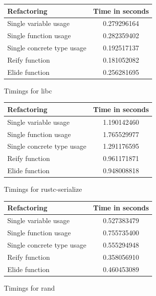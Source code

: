 \begin{figure}[H]
\begin{center}
    \begin{tabular}{ | l | c |}
    \hline
    \textbf{Refactoring} & \textbf{Time in seconds} \\ \hline
    Single variable usage & 0.279296164 \\ \hline
    Single function usage &  0.282359402  \\ \hline
    Single concrete type usage  &  0.192517137 \\ \hline
    Reify function &  0.181052082 \\ \hline
    Elide function &  0.256281695 \\ \hline
    \end{tabular}
\end{center}

\caption{Timings for libc}
\label{Fig:libc}
\end{figure}

\begin{figure}[H]
\begin{center}
    \begin{tabular}{ | l | c |}
    \hline
    \textbf{Refactoring} & \textbf{Time in seconds} \\ \hline
    Single variable usage &  1.190142460 \\ \hline
    Single function usage &  1.765529977  \\ \hline
    Single concrete type usage  &  1.291176595 \\ \hline
    Reify function &  0.961171871  \\ \hline
    Elide function &  0.948008818 \\ \hline
    \end{tabular}
\end{center}

\caption{Timings for rustc-serialize}
\label{Fig:rustc-serialize}
\end{figure}

\begin{figure}[H]
\begin{center}
    \begin{tabular}{ | l | c |}
    \hline
    \textbf{Refactoring} & \textbf{Time in seconds} \\ \hline
    Single variable usage &  0.527383479 \\ \hline
    Single function usage &  0.755735400 \\ \hline
    Single concrete type usage  & 0.555294948 \\ \hline
    Reify function &   0.358056910 \\ \hline
    Elide function & 0.460453089 \\ \hline
    \end{tabular}
\end{center}

\caption{Timings for rand}
\label{Fig:rand}
\end{figure}

